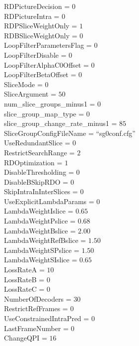 RDPictureDecision        =  $0$ \\
RDPictureIntra           =  $0$ \\
RDPSliceWeightOnly       =  $1$ \\
RDBSliceWeightOnly       =  $0$ \\
LoopFilterParametersFlag = $0$ \\
LoopFilterDisable        = $0$ \\
LoopFilterAlphaC0Offset  = $0$ \\
LoopFilterBetaOffset     = $0$ \\
SliceMode             =  $0$ \\
SliceArgument         = $50$ \\
num\_slice\_groups\_minus1 = $0$ \\
slice\_group\_map\_type   	= $0$ \\
slice\_group\_change\_rate\_minus1    = $85$ \\
SliceGroupConfigFileName          = ``sg0conf.cfg'' \\
UseRedundantSlice     = $0$ \\
RestrictSearchRange      =  $2$ \\
RDOptimization           =  $1$ \\
DisableThresholding      =  $0$ \\
DisableBSkipRDO          =  $0$ \\
SkipIntraInInterSlices   =  $0$ \\
UseExplicitLambdaParams  =  $0$ \\
LambdaWeightIslice       =  $0.65$ \\
LambdaWeightPslice       =  $0.68$ \\
LambdaWeightBslice       =  $2.00$ \\
LambdaWeightRefBslice    =  $1.50$ \\
LambdaWeightSPslice      =  $1.50$ \\
LambdaWeightSIslice      =  $0.65$ \\
LossRateA                = $10$ \\
LossRateB                =  $0$ \\
LossRateC                =  $0$ \\
NumberOfDecoders         = $30$ \\
RestrictRefFrames        =  $0$ \\
UseConstrainedIntraPred  =  $0$ \\
LastFrameNumber          =  $0$ \\
ChangeQPI                = $16$ \\
